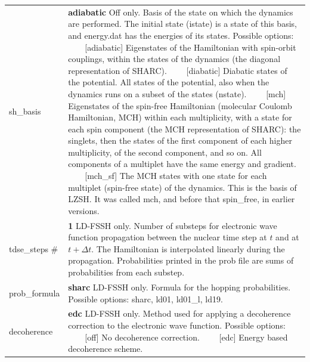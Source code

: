 \documentclass{report}
\newcommand{\tabitem}{~~\llap{--}~~}
\begin{document}
\begin{tabularx}{\textwidth}{ m{2.5cm} X }
sh\_basis	&
	\textbf{adiabatic}	\newline
	Off only. Basis of the state on which the dynamics are performed. The initial state (istate) is a state of this basis, and energy.dat has the energies of its states. Possible options: \newline
	\tabitem [adiabatic] Eigenstates of the Hamiltonian with spin-orbit couplings, within the states of the dynamics (the diagonal representation of SHARC). \newline
	\tabitem [diabatic] Diabatic states of the potential. All states of the potential, also when the dynamics runs on a subset of the states (nstate). \newline
	\tabitem [mch] Eigenstates of the spin-free Hamiltonian (molecular Coulomb Hamiltonian, MCH) within each multiplicity, with a state for each spin component (the MCH representation of SHARC): the singlets, then the states of the first component of each higher multiplicity, of the second component, and so on. All components of a multiplet have the same energy and gradient. \newline
	\tabitem [mch\_sf] The MCH states with one state for each multiplet (spin-free state) of the dynamics. This is the basis of LZSH. It was called mch, and before that spin\_free, in earlier versions. \\

tdse\_steps \#	&
	\textbf{1}	\newline
	LD-FSSH only. Number of substeps for electronic wave function propagation between the nuclear time step at $t$ and at $t + \Delta t$. The Hamiltonian is interpolated linearly during the propagation. Probabilities printed in the prob file are sums of probabilities from each substep. \\

prob\_formula	&
	\textbf{sharc}	\newline
	LD-FSSH only. Formula for the hopping probabilities. Possible options: sharc, ld01, ld01\_l, ld19. \\

decoherence		&
	\textbf{edc}	\newline
	LD-FSSH only. Method used for applying a decoherence correction to the electronic wave function. Possible options: \newline
	\tabitem [off] No decoherence correction. \newline
	\tabitem [edc] Energy based decoherence scheme. \\


\end{tabularx}
\end{document}
